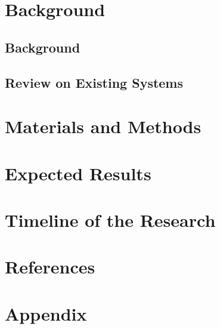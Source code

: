 \documentclass{article}
\begin{document}
\section{Background}
\subsection{Background}

\subsection{Review on Existing Systems}


\section{Materials and Methods}

\section{Expected Results}


\section{Timeline of the Research}


\section{References}
\printbibliography

\section{Appendix}

\end{document}
